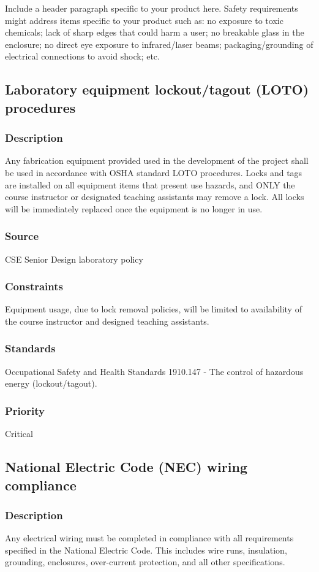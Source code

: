 Include a header paragraph specific to your product here. Safety requirements might address items specific to your product such as: no exposure to toxic chemicals; lack of sharp edges that could harm a user; no breakable glass in the enclosure; no direct eye exposure to infrared/laser beams; packaging/grounding of electrical connections to avoid shock; etc.

\subsection{Laboratory equipment lockout/tagout (LOTO) procedures}
\subsubsection{Description}
Any fabrication equipment provided used in the development of the project shall be used in accordance with OSHA standard LOTO procedures. Locks and tags are installed on all equipment items that present use hazards, and ONLY the course instructor or designated teaching assistants may remove a lock. All locks will be immediately replaced once the equipment is no longer in use.
\subsubsection{Source}
CSE Senior Design laboratory policy
\subsubsection{Constraints}
Equipment usage, due to lock removal policies, will be limited to availability of the course instructor and designed teaching assistants.
\subsubsection{Standards}
Occupational Safety and Health Standards 1910.147 - The control of hazardous energy (lockout/tagout).
\subsubsection{Priority}
Critical

\subsection{National Electric Code (NEC) wiring compliance}
\subsubsection{Description}
Any electrical wiring must be completed in compliance with all requirements specified in the National Electric Code. This includes wire runs, insulation, grounding, enclosures, over-current protection, and all other specifications.
